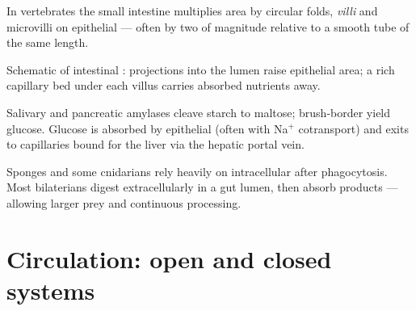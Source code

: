 \begin{proposition}
\label{prop:g12:animal-exchange:villi}
In vertebrates the small intestine multiplies area by circular folds,
\emph{villi} and microvilli on epithelial  --- often
by two  of magnitude relative to a smooth tube of the same length.
\end{proposition}
\admitted

\begin{omfigure}

{\small Schematic of intestinal : projections into the lumen raise
epithelial area; a rich capillary bed under each villus carries absorbed
nutrients away.}
\end{omfigure}

\begin{example}
\label{ex:g12:animal-exchange:starch}
Salivary and pancreatic amylases cleave starch to maltose; brush-border
 yield glucose. Glucose is absorbed by epithelial  (often
with Na$^{+}$ cotransport) and exits to capillaries bound for the liver
via the hepatic portal vein.
\end{example}

\begin{remark}
\label{rem:g12:animal-exchange:extra}
Sponges and some cnidarians rely heavily on intracellular  after
phagocytosis. Most bilaterians digest extracellularly in a gut lumen,
then absorb products --- allowing larger prey and continuous processing.
\end{remark}

\section{Circulation: open and closed systems}

